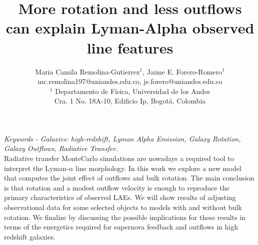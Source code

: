 \documentclass[11pt,a4paper]{article}
\begin{document}
\thispagestyle{empty}

\title{\textbf{More rotation and less outflows can explain Lyman-Alpha observed line features}}
		
\author{Maria Camila Remolina-Gutierrez$^1$, Jaime E. Forero-Romero$^1$\\ \vspace{3mm}
	    mc.remolina197@uniandes.edu.co, \hspace{0.8mm} je.forero@uniandes.edu.co\\ 
		$^1$ Departamento de F\'{i}sica, Universidad de los Andes \\
		Cra. 1 No. 18A-10, Edificio Ip, Bogot\'a, Colombia}
\date{} %
\maketitle\thispagestyle{empty} %
\textit{Keywords - Galaxies: high-redshift, Lyman Alpha Emission, Galaxy Rotation, Galaxy Outflows, Radiative Transfer.}\\

Radiative transfer MonteCarlo simulations are nowadays a required tool
to interpret the Lyman-$\alpha$ line morphology. In this work we
explore a new model that computes the joint effect of outflows and
bulk rotation. The main conclusion is that rotation and a modest
outflow velocity is enough to reproduce the primary characteristics of
observed LAEs. 
We will show results of adjusting observational data for some selected
objects to models with and without bulk rotation. We finalize by
discussing the possible implications for these results in terms of the
energetics required for supernova feedback and outflows in high
redshift galaxies. 





\end{document}
